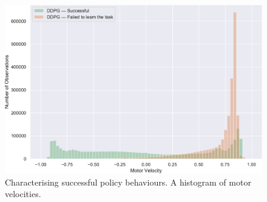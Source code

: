 \documentclass[letterpaper, 10 pt, conference]{ieeeconf}
\begin{document}
\lipsum[1-9]

\begin{figure}[h]
    \centering
    \includegraphics[width=\linewidth]{fig-motor-hist}
    \caption{
        Characterising successful policy behaviours.
        A histogram of motor velocities.
    }
    \label{fig:motor-hist}
\end{figure}
\end{document}
